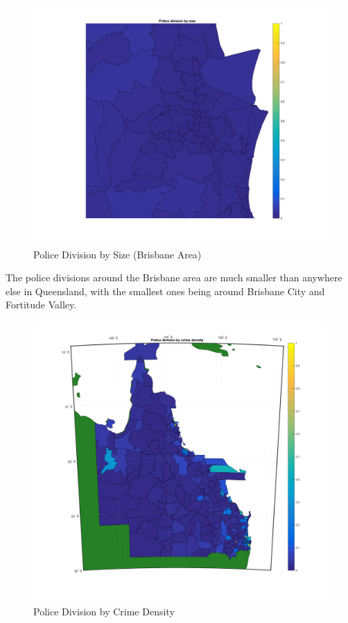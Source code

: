 \documentclass[]{article}
\begin{document}
\begin{figure}[H]
    \caption{Police Division by Size (Brisbane Area)}
    \centering
    \includegraphics[width=\linewidth]{../images/police_division_by_size_brisbane}
\end{figure}

The police divisions around the Brisbane area are much smaller than anywhere else in Queensland, with the smallest ones being around Brisbane City and Fortitude Valley.

\begin{figure}[H]
    \caption{Police Division by Crime Density}
    \centering
    \label{fig:crime_density}
    \includegraphics[width=\linewidth]{../images/police_division_by_crime_density}
\end{figure}
\end{document}
